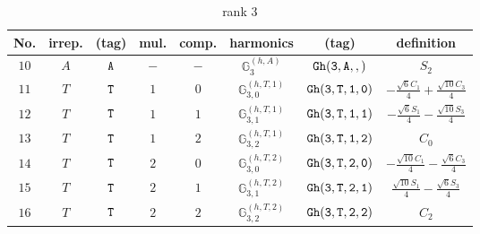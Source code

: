 \documentclass[fleqn,8pt]{jsarticle}
\begin{document}
\begin{table}[ht!]
\begin{center}
\caption{rank 3}
\renewcommand{\arraystretch}{1.3}
\begin{tabular}{cccccccc} \hline \hline
No. & irrep. & (tag) & mul. & comp. & harmonics & (tag) & definition \\ \hline
$ 10 $ & $ A $ & $ {\tt A} $ & $ - $ & $ - $ & $ \mathbb{G}_{3}^{(h,A)} $ & $ {\tt Gh(3,A,,)} $ & $ S_{2} $ \\
$ 11 $ & $ T $ & $ {\tt T} $ & $ 1 $ & $ 0 $ & $ \mathbb{G}_{3,0}^{(h,T,1)} $ & $ {\tt Gh(3,T,1,0)} $ & $ - \frac{\sqrt{6} C_{1}}{4} + \frac{\sqrt{10} C_{3}}{4} $ \\
$ 12 $ & $ T $ & $ {\tt T} $ & $ 1 $ & $ 1 $ & $ \mathbb{G}_{3,1}^{(h,T,1)} $ & $ {\tt Gh(3,T,1,1)} $ & $ - \frac{\sqrt{6} S_{1}}{4} - \frac{\sqrt{10} S_{3}}{4} $ \\
$ 13 $ & $ T $ & $ {\tt T} $ & $ 1 $ & $ 2 $ & $ \mathbb{G}_{3,2}^{(h,T,1)} $ & $ {\tt Gh(3,T,1,2)} $ & $ C_{0} $ \\
$ 14 $ & $ T $ & $ {\tt T} $ & $ 2 $ & $ 0 $ & $ \mathbb{G}_{3,0}^{(h,T,2)} $ & $ {\tt Gh(3,T,2,0)} $ & $ - \frac{\sqrt{10} C_{1}}{4} - \frac{\sqrt{6} C_{3}}{4} $ \\
$ 15 $ & $ T $ & $ {\tt T} $ & $ 2 $ & $ 1 $ & $ \mathbb{G}_{3,1}^{(h,T,2)} $ & $ {\tt Gh(3,T,2,1)} $ & $ \frac{\sqrt{10} S_{1}}{4} - \frac{\sqrt{6} S_{3}}{4} $ \\
$ 16 $ & $ T $ & $ {\tt T} $ & $ 2 $ & $ 2 $ & $ \mathbb{G}_{3,2}^{(h,T,2)} $ & $ {\tt Gh(3,T,2,2)} $ & $ C_{2} $ \\
 \hline \hline
\end{tabular}
\end{center}
\end{table}
\end{document}

